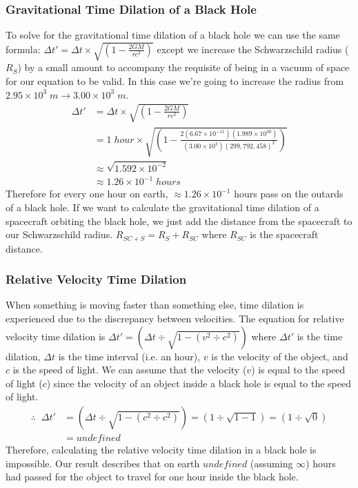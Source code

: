 \documentclass{article}
\begin{document}
\subsubsection{Gravitational Time Dilation of a Black Hole}
To solve for the gravitational time dilation of a black hole we can use the same formula: $\Delta t\prime = \Delta t\times\sqrt{(1-\frac{2GM}{rc^2})}$ except we increase the Schwarzschild radius ($R_{S}$) by a small amount to accompany the requisite of being in a vacuum of space for our equation to be valid. In this case we're going to increase the radius from $2.95 \times 10^{3}\; m \to 3.00 \times 10^{3}\; m$.
\vspace{-0.2cm}
\begin{align*}
    \Delta t\prime & = \Delta t\times\sqrt{(1-\frac{2GM}{rc^2})}                                                                          \\
                   & = 1\; hour \times\sqrt{(1-\frac{2(6.67 \times 10^{-11})(1.989\times 10^{30})}{(3.00 \times 10^{3})(299,792,458)^2})} \\
                   & \approx \sqrt{1.592\times10^{-2}}                                                                                    \\
                   & \approx 1.26 \times 10^{-1} \; hours
\end{align*}
Therefore for every one hour on earth, $\approx 1.26 \times 10^{-1}$ hours pass on the outards of a black hole.
If we want to calculate the gravitational time dilation of a spacecraft orbiting the black hole, we just add the distance from the spacecraft to our Schwarzschild radius. $R_{SC + S} = R_S + R_{SC}$ where $R_{SC}$ is the spacecraft distance.

\subsubsection{Relative Velocity Time Dilation}
When something is moving faster than something else, time dilation is experienced due to the discrepancy between velocities. The equation for relative velocity time dilation is $\Delta t\prime = \left(\Delta t \div \sqrt{1 - (v^2 \div c^2)}\right)$ where $\Delta t\prime$ is the time dilation, $\Delta t$ is the time interval (i.e. an hour), $v$ is the velocity of the object, and $c$ is the speed of light.
We can assume that the velocity ($v$) is equal to the speed of light ($c$) since the velocity of an object inside a black hole is equal to the speed of light.
\vspace{-0.1cm}
\begin{align*}
    \therefore\;\; \Delta t\prime & = \left(\Delta t \div \sqrt{1 - (c^2 \div c^2)}\right) = \left(1 \div \sqrt{1 - 1}\right) = \left(1 \div \sqrt{0}\right) \\
                                  & = undefined
\end{align*}
Therefore, calculating the relative velocity time dilation in a black hole is impossible. Our result describes that on earth $undefined$ (assuming $\infty$) hours had passed for the object to travel for one hour inside the black hole.
\end{document}
